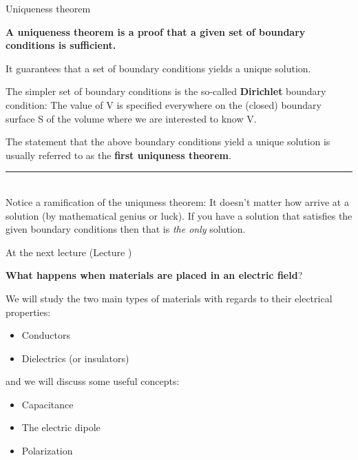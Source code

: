 %
%
%

\begin{frame}{Uniqueness theorem}

{\bf
 A uniqueness theorem is a proof that a given set of boundary conditions is sufficient.
}
\begin{itemize}
{\small
  \item It guarantees that a set of boundary conditions yields a unique solution.
}
\end{itemize}

\vspace{0.2cm}

The simpler set of boundary conditions
is the so-called {\bf Dirichlet} boundary condition:
The value of V is specified everywhere on the (closed) boundary surface S
of the volume where we are interested to know V.
\begin{itemize}
{\small
  \item The statement that the above boundary conditions yield a unique solution
         is usually referred to as the {\bf first uniquness theorem}.
}
\end{itemize}

\vspace{0.4cm}

\noindent\rule{2cm}{0.4pt}\\
{\small
Notice a ramification of the uniquness theorem:
It doesn't matter how arrive at a solution (by mathematical genius or luck).
If you have a solution that satisfies the given boundary conditions
then that is {\em the only} solution.\\
}

\end{frame}


%
%

\renewcommand{\lecturesummarytitle}{Main points to remember }


%
%

\begin{frame}{At the next lecture (Lecture \nextlecture)}

{\bf What happens when materials are placed in an electric field}?\\

\vspace{0.2cm}

We will study the two main types of materials with regards to their electrical properties:
\begin{itemize}
  \item Conductors
  \item Dielectrics (or insulators)
\end{itemize}

\vspace{0.2cm}
and we will discuss some useful concepts:

\begin{itemize}
  \item Capacitance
  \item The electric dipole
  \item Polarization
\end{itemize}

\end{frame}

%
%



